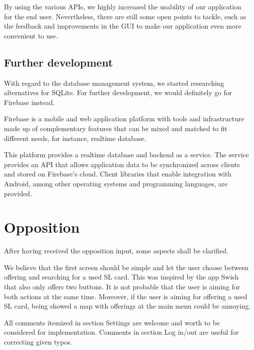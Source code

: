 \documentclass[11pt,twoside,a4paper]{report}
\begin{document}
By using the various APIs, we highly increased the usability of our application for the end user. Nevertheless, there are still some open points to tackle, such as the feedback and improvements in the GUI to make our application even more convenient to use.

\section{Further development}

With regard to the database management system, we started researching alternatives for SQLite. For further development, we would definitely go for Firebase instead. 

Firebase is a mobile and web application platform with tools and infrastructure made up of complementary features that can be mixed and matched to fit different needs, for instance, realtime database\cite{firebase}.

This platform provides a realtime database and backend as a service. The service provides an API that allows application data to be synchronized across clients and stored on Firebase's cloud. Client libraries that enable integration with Android, among other operating systems and programming languages, are provided.

\chapter{Opposition}

After having received the opposition input, some aspects shall be clarified.

We believe that the first screen should be simple and let the user choose between offering and searching for a used SL card. This was inspired by the app Swish that also only offers two buttons\cite{swish}. It is not probable that the user is aiming for both actions at the same time. Moreover, if the user is aiming for offering a used SL card, being showed a map with offerings at the main menu could be annoying.

All comments itemized in section Settings are welcome and worth to be considered for implementation. Comments in section Log in/out are useful for correcting given typos.
\end{document}
